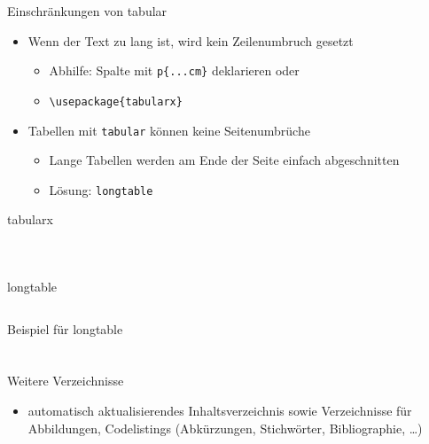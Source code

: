 \documentclass[presentation,aspectratio=169]{beamer}
\begin{document}
\begin{frame}[fragile]{Einschränkungen von tabular}
  \begin{itemize}
    \item Wenn der Text zu lang ist, wird kein Zeilenumbruch gesetzt
      \begin{itemize}
        \item Abhilfe: Spalte mit \verb|p{...cm}| deklarieren oder
        \item \verb|\usepackage{tabularx}|
      \end{itemize}
    \item Tabellen mit \verb|tabular| können keine Seitenumbrüche
      \begin{itemize}
        \item Lange Tabellen werden am Ende der Seite einfach abgeschnitten
        \item Lösung: \verb|longtable|
      \end{itemize}
  \end{itemize}
\end{frame}

\begin{frame}[fragile]{tabularx}
  \begin{columns}
    \begin{column}{.35\textwidth}
      
    \end{column}
    \begin{column}{.55\textwidth}
      \inputminted{latex}{codebeispiele/table-tabularx.tex}
    \end{column}
  \end{columns}
\end{frame}

\begin{frame}[fragile]{longtable}
  \inputminted{latex}{codebeispiele/table-longtable.tex}
\end{frame}

\begin{frame}{Beispiel für longtable}
  
\end{frame}

\section{}

\begin{frame}[fragile]{Weitere Verzeichnisse}
  \begin{itemize}
    \item automatisch aktualisierendes Inhaltsverzeichnis sowie Verzeichnisse für Abbildungen, Codelistings (Abkürzungen, Stichwörter, Bibliographie, \dots)
  \end{itemize}
  \inputminted{latex}{codebeispiele/list-of-everything.tex}
\end{frame}
\end{document}
